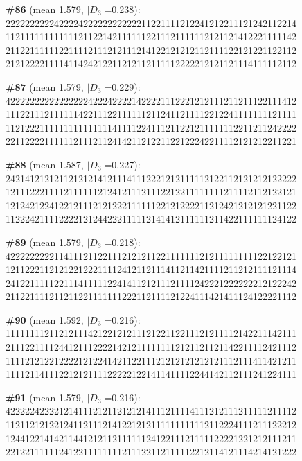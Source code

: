 \documentclass[10pt]{article}
\begin{document}
\noindent\textbf{\#86} (mean 1.579, $|D_3|$=0.238):\\
222222222242222422222222222211221111212241212211121242112214\\
112111111111111211221421111112211121111112121121412221111142\\
211221111112211112111212111214122121212112111122121221122112\\
212122221111411424212211212112111112222212121121114111112112\medskip

\noindent\textbf{\#87} (mean 1.579, $|D_3|$=0.229):\\
422222222222222224222422221422221112221212111211211122111412\\
111221112111111422111221111112112411211112212241111111121111\\
112122211111111111111141111224111211221211111112211211242222\\
221122221111112111211241421121221122122242211112121212211221\medskip

\noindent\textbf{\#88} (mean 1.587, $|D_3|$=0.227):\\
242141212121121212141211141112221212111112122112121212122222\\
121112221111211111121241211121112212211111111211112112122121\\
121242122412212111212122211111122121222211212421212121221122\\
112224211112222121244222111112141412111111211422111111124122\medskip

\noindent\textbf{\#89} (mean 1.579, $|D_3|$=0.218):\\
422222222211411121122111212121122111111121211111111122122121\\
121122211212122122211112412112111411211421111211212111121114\\
241221111122111411111224141121211121111242221222222212122242\\
211221111211211221111111222112111121224111421411124122221112\medskip

\noindent\textbf{\#90} (mean 1.592, $|D_3|$=0.216):\\
111111112112121114212212121112122112211121211112142211142111\\
211122111124412111222214212111111112121121121142211112421112\\
111121212212222121224142112211121212121212121112111411421211\\
111121141112212121111222221221411411112244142112111241224111\medskip

\noindent\textbf{\#91} (mean 1.579, $|D_3|$=0.216):\\
422222422221214111212112121214111211114111212111211111211112\\
112112121221241121112141221212111111111112112224111211122212\\
124412214142114412121121111112412211121111122221221212111211\\
221221111112412211111111211122112111112212114121114214121222\medskip
\end{document}
